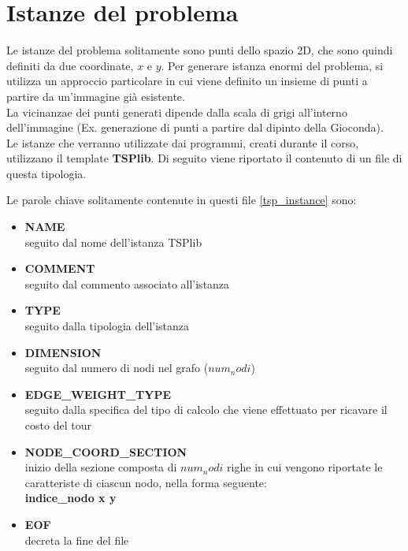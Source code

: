 \chapter{Istanze del problema}
Le istanze del problema solitamente sono punti dello spazio 2D, che sono quindi definiti da due coordinate, $x$ e $y$.
Per generare istanza enormi del problema, si utilizza un approccio particolare in cui viene definito un insieme di punti a partire da un'immagine già esistente.\\
La vicinanzae dei punti generati dipende dalla scala di grigi all'interno dell'immagine (Ex. generazione di punti a partire dal dipinto della Gioconda\cite{monnalisa}).\\
Le istanze che verranno utilizzate dai programmi, creati durante il corso, utilizzano il template \textbf{TSPlib}. Di seguito viene riportato il contenuto di un file di questa tipologia.
 


Le parole chiave solitamente contenute in questi file \ref{tsp_instance} sono:
\begin{itemize}
\item{\textbf{NAME}\\
seguito dal nome dell'istanza TSPlib}
\item{\textbf{COMMENT}\\
seguito dal commento associato all'istanza}
\item{\textbf{TYPE}\\
seguito dalla tipologia dell'istanza}
\item{\textbf{DIMENSION}\\
seguito dal numero di nodi nel grafo ($num_nodi$)}
\item{\textbf{EDGE\_WEIGHT\_TYPE}\\
seguito dalla specifica del tipo di calcolo che viene effettuato per ricavare il costo del tour}
\item{\textbf{NODE\_COORD\_SECTION}\\
inizio della sezione composta di $num_nodi$ righe in cui vengono riportate le caratteriste di ciascun nodo, nella forma seguente:\\
\textbf{indice\_nodo  x  y}}
\item{\textbf{EOF}\\
decreta la fine del file}
\end{itemize}